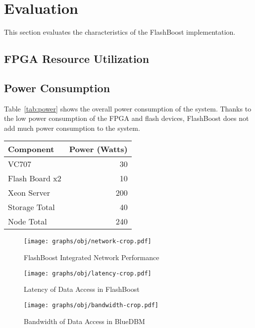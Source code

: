\section{Evaluation}
\label{sec:results}

This section evaluates the characteristics of the FlashBoost implementation.

\subsection{FPGA Resource Utilization}

\subsection{Power Consumption}
Table~\ref{tab:power} shows the overall power consumption of the system. Thanks
to the low power consumption of the FPGA and flash devices, FlashBoost does not
add much power consumption to the system.

\begin{tabular}{l | r}
\label{tab:power}
Component & Power (Watts) \\
\hline \hline
VC707 & 30 \\
Flash Board x2 & 10 \\
Xeon Server & 200 \\
\hline
Storage Total & 40 \\
Node Total & 240 \\

\end{tabular}

\begin{figure*}[ht]
\centering
\vspace{0pt}
\begin{minipage}[c]{.3\textwidth}
	\texttt{[image: graphs/obj/network-crop.pdf]}
	\caption{FlashBoost Integrated Network Performance}
	\label{fig:result_network}
\end{minipage}\hfill
\vspace{0pt}
\begin{minipage}[c]{.3\textwidth}
	\texttt{[image: graphs/obj/latency-crop.pdf]}
	\caption{Latency of Data Access in FlashBoost}
	\label{fig:result_latency}
\end{minipage}\hfill
\vspace{0pt}
\begin{minipage}[c]{.3\textwidth}
	\texttt{[image: graphs/obj/bandwidth-crop.pdf]}
	\caption{Bandwidth of Data Access in BlueDBM}
	\label{fig:result_bandwidth}
\end{minipage}
\end{figure*}

